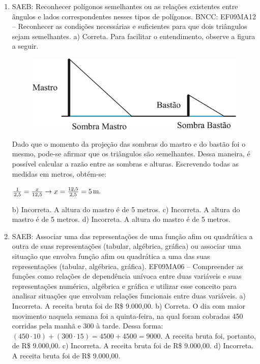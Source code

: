 \begin{enumerate}
\item
SAEB: Reconhecer polígonos semelhantes ou as relações existentes
entre ângulos e lados correspondentes nesses tipos de polígonos.
BNCC: EF09MA12 -- Reconhecer as condições necessárias e suficientes para
que dois triângulos sejam semelhantes.
a) Correta. Para facilitar o entendimento, observe a figura a seguir.

\begin{figure}[htpb!]
\centering
\includegraphics[width=\textwidth]{./ilustras-mat/Simulado_2-atividade_11.png}
\end{figure}


Dado que o momento da projeção das sombras do mastro e do bastão foi o
mesmo, pode-se afirmar que os triângulos são semelhantes. Dessa maneira, 
é possível calcular a razão entre as sombras e alturas.
Escrevendo todas as medidas em metros, obtém-se:

$\frac{1}{2,5} = \frac{x}{12,5} \rightarrow \\
x = \frac{12,5}{2,5} = 5$m.

b) Incorreta. A altura do mastro é de 5 metros.
c) Incorreta. A altura do mastro é de 5 metros.
d) Incorreta. A altura do mastro é de 5 metros.

\item
SAEB: Associar uma das representações de uma função afim ou
quadrática a outra de suas representações (tabular, algébrica, gráfica)
ou associar uma situação que envolva função afim ou quadrática a uma das
suas representações (tabular, algébrica, gráfica).
EF09MA06 -- Compreender as funções como relações de dependência unívoca
entre duas variáveis e suas representações numérica, algébrica e gráfica
e utilizar esse conceito para analisar situações que envolvam relações
funcionais entre duas variáveis.
a) Incorreta. A receita bruta foi de R\$ 9.000,00.
b) Correta. O dia com maior movimento naquela semana foi a quinta-feira,
na qual foram cobradas 450 corridas pela manhã e 300 à tarde. Dessa forma:
$(450 \cdot 10) + (300 \cdot 15) = 4500 + 4500 = 9000$. A receita bruta
foi, portanto, de R\$ 9.000,00.
c) Incorreta. A receita bruta foi de R\$ 9.000,00.
d) Incorreta. A receita bruta foi de R\$ 9.000,00.


\end{enumerate}
